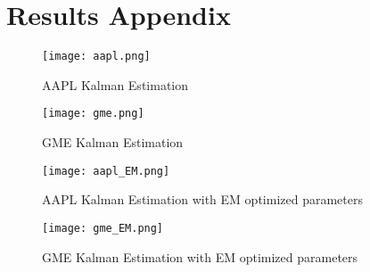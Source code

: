 \documentclass[12pt, letterpaper]{article}
\begin{document}



\appendix
\section{Results Appendix}


\begin{figure}[htbp!]
\centering
  \centering
  \texttt{[image: aapl.png]}
  \caption{AAPL Kalman Estimation}

  \centering
  \texttt{[image: gme.png]}
  \caption{GME Kalman Estimation}
\end{figure}

\begin{figure}[htbp!]
\centering
  \centering
  \texttt{[image: aapl\_EM.png]}
  \caption{AAPL Kalman Estimation with EM optimized parameters}

  \centering
  \texttt{[image: gme\_EM.png]}
  \caption{GME Kalman Estimation with EM optimized parameters}
\end{figure}
\end{document}
